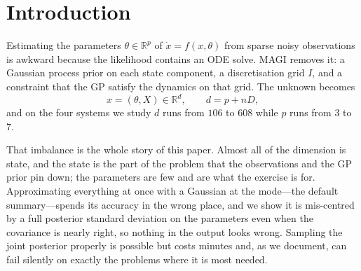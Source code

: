 \documentclass[11pt]{article}
\newcommand{\R}{\mathbb{R}}
\theoremstyle{plain}
\theoremstyle{definition}
\theoremstyle{remark}
\begin{document}
\begin{abstract}
We therefore also report a pre-inference diagnosis, costing seconds and no sampling, that
establishes whether the mode is a mode, whether it is the only one, which parameters the data
determines, whether the posterior is proper, and whether the GP constrains the states at all. The
last of these is the one that mattered: the others reported the broken hyperparameter fit
faithfully as a property of the model.
\end{abstract}

\section{Introduction}

Estimating the parameters $\theta \in \R^p$ of $\dot x = f(x,\theta)$ from sparse noisy
observations is awkward because the likelihood contains an ODE solve. MAGI \cite{yang2021} removes
it: a Gaussian process prior on each state component, a discretisation grid $I$, and a constraint
that the GP satisfy the dynamics on that grid. The unknown becomes
\[
  x = (\theta, X) \in \R^d, \qquad d = p + nD,
\]
and on the four systems we study $d$ runs from $106$ to $608$ while $p$ runs from $3$ to $7$.

That imbalance is the whole story of this paper. Almost all of the dimension is state, and the
state is the part of the problem that the observations and the GP prior pin down; the parameters
are few and are what the exercise is for. Approximating everything at once with a Gaussian at the
mode---the default summary---spends its accuracy in the wrong place, and we show it is mis-centred
by a full posterior standard deviation on the parameters even when the covariance is nearly right,
so nothing in the output looks wrong. Sampling the joint posterior properly is possible but costs
minutes and, as we document, can fail silently on exactly the problems where it is most needed.
\end{document}
